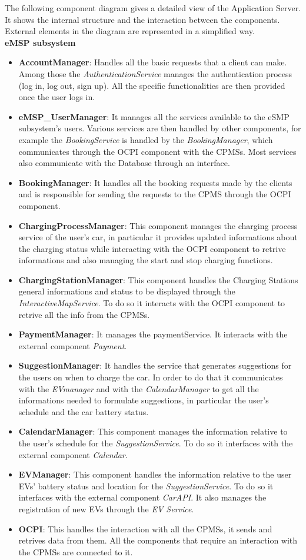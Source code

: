 \documentclass[table, 12pt]{article}
\begin{document}
The following component diagram gives a detailed view of the Application Server. It shows the internal structure and the interaction between the components.
External elements in the diagram are represented in a simplified way.
\\
\textbf{eMSP subsystem}
\begin{itemize}
    \item \textbf{AccountManager}: Handles all the basic requests that a client can make. Among those the \textit{AuthenticationService} manages the authentication process (log in, log out, sign up). All the specific functionalities are then provided once the user logs in.
    \item \textbf{eMSP\_UserManager}: It manages all the services available to the eSMP subsystem's users. Various services are then handled by other components, for example the \textit{BookingService} is handled by the \textit{BookingManager}, which communicates through the OCPI component with the CPMSs. Most services also communicate with the Database through an interface.
    \item \textbf{BookingManager}: It handles all the booking requests made by the clients and is responsible for sending the requests to the CPMS through the OCPI component.
    \item \textbf{ChargingProcessManager}: This component manages the charging process service of the user's car, in particular it provides updated informations about the charging status while interacting with the OCPI component to retrive informations and also managing the start and stop charging functions.
    \item \textbf{ChargingStationManager}: This component  handles the Charging Stations general informations and status to be displayed through the \textit{InteractiveMapService}. To do so it interacts with the OCPI component to retrive all the info from the CPMSs.
    \item \textbf{PaymentManager}: It manages the paymentService. It interacts with the external component \textit{Payment}.
    \item \textbf{SuggestionManager}: It handles the service that generates suggestions for the users on when to charge the car. In order to do that it communicates with the \textit{EVmanager} and with the \textit{CalendarManager} to get all the informations needed to formulate suggestions, in particular the user's schedule and the car battery status.
    \item \textbf{CalendarManager}: This component manages the information relative to the user's schedule for the \textit{SuggestionService}. To do so it interfaces with the external component \textit{Calendar}.
    \item \textbf{EVManager}: This component handles the information relative to the user EVs' battery status and location for the \textit{SuggestionService}. To do so it interfaces with the external component \textit{CarAPI}. It also manages the registration of new EVs through the \textit{EV Service}.
    \item \textbf{OCPI}: This  handles the interaction with all the CPMSs, it sends and retrives data from them. All the components that require an interaction with the CPMSs are connected to it.
\end{itemize}
\end{document}
